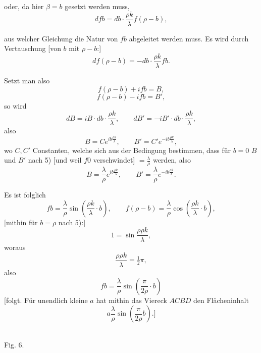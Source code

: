 %
\noindent oder, da hier $\beta = b$ gesetzt werden muss,
\[
\tag*{7)} dfb = db\cdot\frac{\rho k}{\lambda} f(\rho-b),
\]

aus welcher Gleichung die Natur von $fb$ abgeleitet werden muss. Es wird durch Vertauschung [von $b$ mit $\rho-b$:]
\[
\tag*{8)} df(\rho-b) = -db\cdot\frac{\rho k}{\lambda} fb.
\]

Setzt man also
\[
f(\rho-b) + ifb = B,
\]
\[
f(\rho-b) - ifb = B',
\]
so wird
\[
dB = iB\cdot db\cdot\frac{\rho k}{\lambda}, \qquad dB' = -iB'\cdot db\cdot\frac{\rho k}{\lambda},
\]
also
\[
B = Ce^{ib\frac{\rho k}{\lambda}}, \qquad B' = C'e^{-ib\frac{\rho k}{\lambda}},
\]
wo $C, C'$ Constanten, welche sich aus der Bedingung bestimmen, dass für $b=0$ $B$ und $B'$ nach 5) [und weil $f0$ verschwindet] $=\frac{\lambda}{\rho}$ werden, also
\[
B = \frac{\lambda}{\rho} e^{ib\frac{\rho k}{\lambda}}, \qquad B' = \frac{\lambda}{\rho} e^{-ib\frac{\rho k}{\lambda}}.
\]

Es ist folglich
\[
fb = \frac{\lambda}{\rho}\sin\left(\frac{\rho k}{\lambda}\cdot b\right), \qquad f(\rho-b) = \frac{\lambda}{\rho}\cos\left(\frac{\rho k}{\lambda}\cdot b\right),
\]
[mithin für $b=\rho$ nach 5):]
\[
1 = \sin\frac{\rho\rho k}{\lambda},
\]
woraus
\[
\frac{\rho\rho k}{\lambda} = \tfrac{1}{2}\pi,
\]
also
\[
fb = \frac{\lambda}{\rho}\sin\left(\frac{\pi}{2\rho}\cdot b\right)
\]
[folgt. Für unendlich kleine $a$ hat mithin das Viereck $ACBD$ den Flächeninhalt
\[
a\frac{\lambda}{\rho}\sin\left(\frac{\pi}{2\rho} b\right).]
\]

\begin{center}\begin{minipage}{\linewidth}\centering\\[3pt]Fig. 6.\end{minipage}\end{center}
